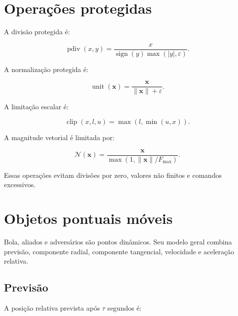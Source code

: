 \documentclass[12pt,a4paper]{article}
\newcommand{\vect}[1]{\boldsymbol{#1}}
\DeclareMathOperator{\clip}{clip}
\begin{document}
\section{Opera\c{c}\~oes protegidas}

A divis\~ao protegida \'e:

\begin{equation}
  \operatorname{pdiv}(x,y)=\frac{x}{\operatorname{sign}(y)\max(|y|,\varepsilon)}.
\end{equation}

A normaliza\c{c}\~ao protegida \'e:

\begin{equation}
  \operatorname{unit}(\vect{x})=\frac{\vect{x}}{\|\vect{x}\|+\varepsilon}.
\end{equation}

A limita\c{c}\~ao escalar \'e:

\begin{equation}
  \clip(x,l,u)=\max(l,\min(u,x)).
\end{equation}

A magnitude vetorial \'e limitada por:

\begin{equation}
  \mathcal{N}(\vect{x})=
  \frac{\vect{x}}{\max\left(1,\|\vect{x}\|/F_{\max}\right)}.
\end{equation}

Essas opera\c{c}\~oes evitam divis\~oes por zero, valores n\~ao finitos e comandos excessivos.

\section{Objetos pontuais m\'oveis}

Bola, aliados e advers\'arios s\~ao pontos din\^amicos. Seu modelo geral combina previs\~ao, componente radial, componente tangencial, velocidade e acelera\c{c}\~ao relativa.

\subsection{Previs\~ao}

A posi\c{c}\~ao relativa prevista ap\'os $\tau$ segundos \'e:
\end{document}
